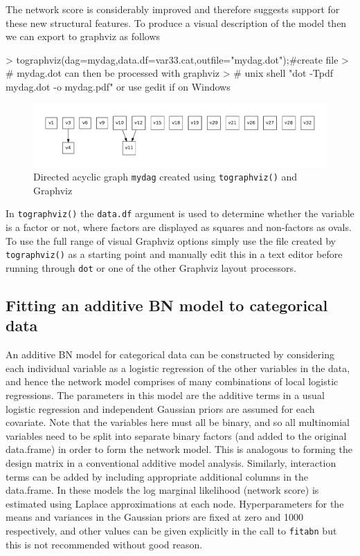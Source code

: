 \documentclass[nojss]{jss}
\begin{document}
The network score is considerably improved and therefore suggests support for these new structural features. To produce a visual description of the model then we can export to graphviz as follows
\begin{Schunk}
\begin{Sinput}
> tographviz(dag=mydag,data.df=var33.cat,outfile="mydag.dot");#create file
> # mydag.dot can then be processed with graphviz
> # unix shell "dot -Tpdf mydag.dot -o mydag.pdf" or use gedit if on Windows
\end{Sinput}
\end{Schunk}

\begin{figure}[htb]
\includegraphics{mydag}
\vspace{-1.0cm}
\caption{Directed acyclic graph {\tt mydag} created using {\tt tographviz()} and Graphviz} \label{fig2}
\end{figure}
In {\tt tographviz()} the {\tt data.df} argument is used to determine whether the variable is a factor or not, where factors are displayed as squares and non-factors as ovals. To use the full range of visual Graphviz options simply use the file created by {\tt tographviz()} as a starting point and manually edit this in a text editor before running through {\tt dot} or one of the other Graphviz layout processors.

\subsection{Fitting an additive BN model to categorical data} \label{sec2}
An additive BN model for categorical data can be constructed by considering each individual variable as a logistic regression of the other variables in the data, and hence the network model comprises of many combinations of local logistic regressions. The parameters in this model are the additive terms in a usual logistic regression and independent Gaussian priors are assumed for each covariate. Note that the variables here must all be binary, and so all multinomial variables need to be split into separate binary factors (and added to the original data.frame) in order to form the network model. This is analogous to forming the design matrix in a conventional additive model analysis. Similarly, interaction terms can be added by including appropriate additional columns in the data.frame. In these models the log marginal likelihood (network score) is estimated using Laplace approximations at each node. Hyperparameters for the means and variances in the Gaussian priors are fixed at zero and 1000 respectively, and other values can be given explicitly in the call to {\tt fitabn} but this is not recommended without good reason.
\end{document}
